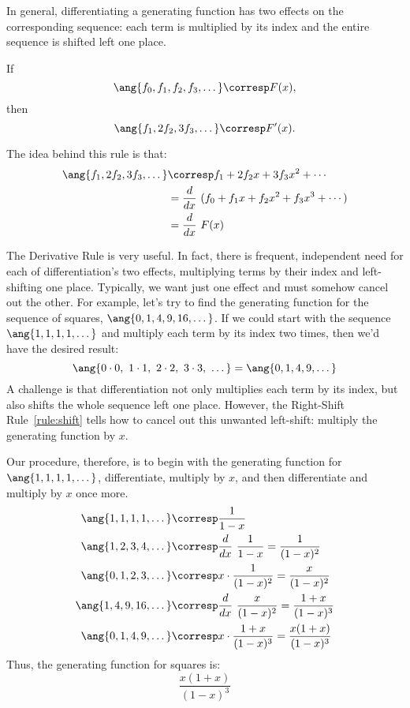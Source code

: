 In general, differentiating a generating function has two effects on
the corresponding sequence: each term is multiplied by its index and
the entire sequence is shifted left one place.

\begin{mathrule}
\label{rule:derivative}
If
\[
\ang{f_0, f_1, f_2, f_3, \dots} \corresp F(x),
\]
then
%
\[
\ang{f_1, 2f_2, 3f_3, \dots} \corresp F'(x).
\]
\end{mathrule}

The idea behind this rule is that:
\begin{align*}
\ang{f_1, 2f_2, 3f_3, \dots}
    & \corresp f_1 + 2 f_2 x + 3 f_3 x^2 + \cdots \\
    & = \frac{d}{dx} \ (f_0 + f_1 x + f_2 x^2 + f_3 x^3 + \cdots) \\
    & = \frac{d}{dx} \ F(x)
\end{align*}

The Derivative Rule is very useful.  In fact, there is frequent,
independent need for each of differentiation's two effects,
multiplying terms by their index and left-shifting one place.
Typically, we want just one effect and must somehow cancel out the
other.  For example, let's try to find the generating function for the
sequence of squares, $\ang{0, 1, 4, 9, 16, \dots}$.  If we could
start with the sequence $\ang{1, 1, 1, 1, \dots}$ and multiply each term by
its index two times, then we'd have the desired result:
%
\[
\ang{0 \cdot 0,\ 1 \cdot 1,\ 2 \cdot 2,\ 3 \cdot 3,\ \dots}
= 
\ang{0, 1, 4, 9, \dots}
\]
%
A challenge is that differentiation not only multiplies each term by
its index, but also shifts the whole sequence left one place.
However, the Right-Shift Rule~\ref{rule:shift} tells how to cancel out
this unwanted left-shift: multiply the generating function by $x$.

Our procedure, therefore, is to begin with the generating function for
$\ang{1, 1, 1, 1, \dots}$, differentiate, multiply by $x$, and then
differentiate and multiply by $x$ once more.
%
\begin{align*}
\ang{1, 1, 1, 1, \dots}  & \corresp \frac{1}{1-x} \\
\ang{1, 2, 3, 4, \dots}  & \corresp \frac{d}{dx} \ \frac{1}{1-x}
                                          = \frac{1}{(1-x)^2} \\
\ang{0, 1, 2, 3, \dots}  & \corresp x \cdot \frac{1}{(1-x)^2}
                                          = \frac{x}{(1-x)^2} \\
\ang{1, 4, 9, 16, \dots} & \corresp \frac{d}{dx} \ \frac{x}{(1-x)^2}
                                          = \frac{1+x}{(1-x)^3} \\
\ang{0, 1, 4, 9, \dots}  & \corresp x \cdot \frac{1+x}{(1-x)^3}
                                          = \frac{x(1+x)}{(1-x)^3}
\end{align*}
%
Thus, the generating function for squares is:
%
\begin{equation}\label{squares_gen_func}
\frac{x(1+x)}{(1-x)^3}
\end{equation}

